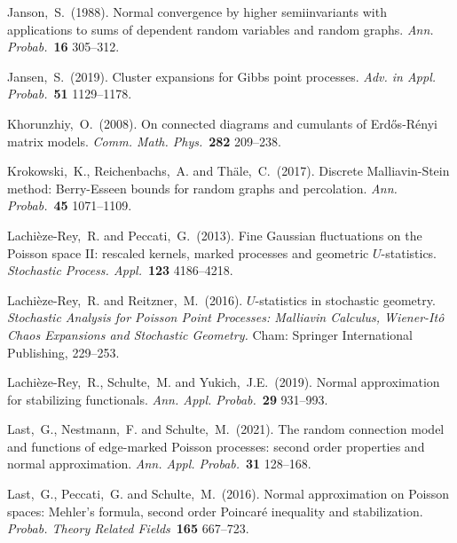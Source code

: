 \documentclass[bj,authoryear,noshowframe]{imsart}
\theoremstyle{plain}
\theoremstyle{remark}
\let\Horig\H
\begin{document}
\begin{thebibliography}{4}
  Janson,~S.~(1988).
  Normal convergence by higher semiinvariants with applications to sums of dependent random variables and random graphs.
  \textit{Ann. Probab.}~\textbf{16} 305--312.

  Jansen,~S.~(2019).
  Cluster expansions for Gibbs point processes.
  \textit{Adv. in Appl. Probab.}~\textbf{51} 1129--1178.

  Khorunzhiy,~O.~(2008).
  On connected diagrams and cumulants of {E}rd{\Horig{o}}s-{R}\'enyi matrix models.
  \textit{Comm. Math. Phys.}~\textbf{282} 209--238.

  Krokowski,~K., Reichenbachs,~A. and Th{\"a}le,~C.~(2017).
  Discrete Malliavin-Stein method: Berry-Esseen bounds for
    random graphs and percolation.
  \textit{Ann. Probab.}~\textbf{45} 1071--1109.

  Lachi\`eze-Rey,~R. and Peccati,~G.~(2013).
  Fine {G}aussian fluctuations on the {P}oisson space {II}: rescaled kernels, marked processes and geometric {$U$}-statistics.
  \textit{Stochastic Process. Appl.}~\textbf{123} 4186--4218.

  Lachi\`eze-Rey,~R. and Reitzner,~M.~(2016).
  $U$-statistics in stochastic geometry.
  {\em Stochastic Analysis for {P}oisson Point Processes: {M}alliavin Calculus, {W}iener-{I}t{\^o} Chaos Expansions and Stochastic Geometry.} Cham: Springer International Publishing, 229--253.

  Lachi\`eze-Rey,~R., Schulte,~M. and Yukich,~J.E.~(2019).
  Normal approximation for stabilizing functionals.
  \textit{Ann. Appl. Probab.}~\textbf{29} 931--993.

  Last,~G., Nestmann,~F. and Schulte,~M.~(2021).
  The random connection model and functions of edge-marked {P}oisson processes: second order properties and normal approximation.
  \textit{Ann. Appl. Probab.}~\textbf{31} 128--168.

  Last,~G., Peccati,~G. and Schulte,~M.~(2016).
  Normal approximation on Poisson spaces: Mehler's formula, second order Poincar\'e inequality and stabilization.
  \textit{Probab. Theory Related Fields}~\textbf{165} 667--723.


\end{thebibliography}
\end{document}
